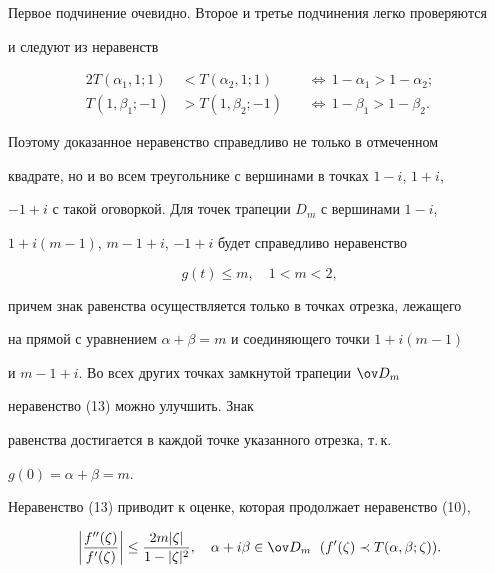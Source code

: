Первое подчинение очевидно. Второе и третье подчинения легко проверяются


и следуют из неравенств


\begin{alignat*}{2}


T(\alpha_1,1;1)&<T(\alpha_2,1;1) &\, &\Longleftrightarrow\,


1-\alpha_1>1-\alpha_2; \\


T(1,\beta_1;-1)&>T(1,\beta_2;-1) &\, &\Longleftrightarrow\,


1-\beta_1>1-\beta_2.


\end{alignat*}


Поэтому доказанное неравенство справедливо не только в отмеченном


квадрате, но и во всем треугольнике с вершинами в точках $1-i$, $1+i$,


$-1+i$ с такой оговоркой. Для точек трапеции $D_m$ с вершинами $1-i$,


$1+i(m-1)$, $m-1+i$, $-1+i$ будет справедливо неравенство


\begin{equation}


g(t)\le m,\quad 1<m<2,


\end{equation}


причем знак равенства осуществляется только в точках отрезка, лежащего


на прямой с уравнением $\alpha+\beta=m$ и соединяющего точки $1+i(m-1)$


и $m-1+i$. Во всех других точках замкнутой трапеции $\ov D_m$


неравенство (13) можно улучшить. Знак


равенства достигается в каждой точке указанного отрезка, т.\,к.


$g(0)=\alpha+\beta=m$.


Неравенство (13) приводит к оценке, которая продолжает неравенство (10),


\begin{equation}


\biggl|\frac{f''(\zeta)}{f'(\zeta)} \biggr|\le


\frac{2m|\zeta|}{1-|\zeta|^2},\quad\alpha+i\beta\in\ov D_m


\ \;(f'(\zeta)\prec T(\alpha,\beta;\zeta)).


\end{equation}



